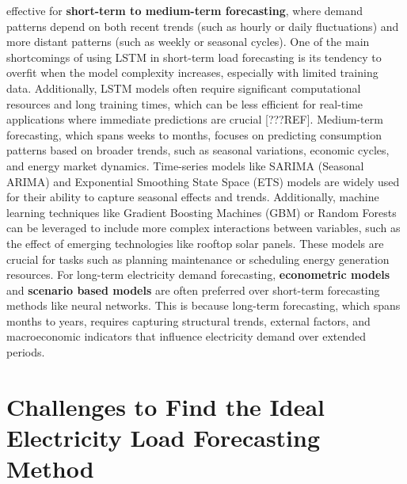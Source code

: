 \documentclass[mstat,12pt]{unswthesis}
\begin{document}
effective for \textbf{short-term to medium-term forecasting}, where
demand patterns depend on both recent trends (such as hourly or daily
fluctuations) and more distant patterns (such as weekly or seasonal
cycles). One of the main shortcomings of using LSTM in short-term load
forecasting is its tendency to overfit when the model complexity
increases, especially with limited training data. Additionally, LSTM
models often require significant computational resources and long
training times, which can be less efficient for real-time applications
where immediate predictions are crucial {[}???REF{]}. Medium-term
forecasting, which spans weeks to months, focuses on predicting
consumption patterns based on broader trends, such as seasonal
variations, economic cycles, and energy market dynamics. Time-series
models like SARIMA (Seasonal ARIMA) and Exponential Smoothing State
Space (ETS) models are widely used for their ability to capture seasonal
effects and trends. Additionally, machine learning techniques like
Gradient Boosting Machines (GBM) or Random Forests can be leveraged to
include more complex interactions between variables, such as the effect
of emerging technologies like rooftop solar panels. These models are
crucial for tasks such as planning maintenance or scheduling energy
generation resources. For long-term electricity demand forecasting,
\textbf{econometric models} and \textbf{scenario based models} are often
preferred over short-term forecasting methods like neural networks. This
is because long-term forecasting, which spans months to years, requires
capturing structural trends, external factors, and macroeconomic
indicators that influence electricity demand over extended periods.

\section{Challenges to Find the Ideal Electricity Load Forecasting
Method}\label{challenges-to-find-the-ideal-electricity-load-forecasting-method}
\end{document}
